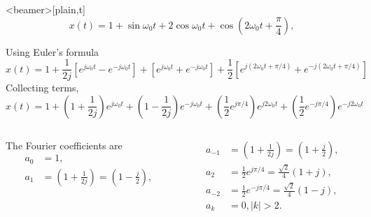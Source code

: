 \begin{frame}<beamer>[plain,t]
        \begin{equation*}
            x(t) = 1 + \sin \omega_0t + 2\cos\omega_0t+ \cos\left(2\omega_0t+ \frac{\pi}{4}\right),
        \end{equation*}

        Using Euler's formula
        \begin{equation*}
            x(t) = 1 + \frac{1}{2j}\left[e^{j\omega_0 t} - e^{-j\omega_0 t}\right] + \left[e^{j\omega_0 t} + e^{-j\omega_0 t}\right] + \frac{1}{2}\left[e^{j(2\omega_0 t + \pi/4)} + e^{-j(2\omega_0 t + \pi/4)}\right]
        \end{equation*}
        Collecting terms,
        \begin{equation*}
            x(t) = 1 + \left(1 + \frac{1}{2j}\right)e^{j\omega_0 t} +  \left(1 - \frac{1}{2j}\right)e^{-j\omega_0 t} + \left(\frac{1}{2} e^{j\pi/4}\right)e^{j2\omega_0 t} + \left(\frac{1}{2} e^{-j\pi/4}\right)e^{-j2\omega_0 t}
        \end{equation*}
        \begin{columns}
            \begin{column}{0.5\textwidth}
                The Fourier coefficients are
                \begin{equation*}
                    \begin{split}
                        a_0 &= 1,\\
                        a_1 &= \left(1 + \frac{1}{2j}\right) = \left(1 - \frac{j}{2}\right),
                    \end{split}
                \end{equation*}
            \end{column}
            \begin{column}{0.5\textwidth}
                \begin{equation*}
                    \begin{split}
                        a_{-1} &= \left(1 + \frac{1}{2j}\right) = \left(1 + \frac{j}{2}\right),\\
                        a_2 &= \frac{1}{2}e^{j\pi/4} = \frac{\sqrt{2}}{4}(1+j),\\
                        a_{-2} &= \frac{1}{2}e^{-j\pi/4} = \frac{\sqrt{2}}{4}(1-j),\\
                        a_k &= 0, |k|>2.
                    \end{split}
                \end{equation*}
            \end{column}
        \end{columns}

\end{frame}

